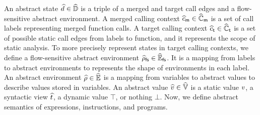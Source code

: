 An abstract state $\widehat{d} \in \widehat{\mathbb{D}}$ is a triple of a merged and target call
edges and a flow-sensitive abstract environment.  A merged calling context
$\widehat{c}_{\textsf{m}} \in \widehat{\mathbb{C}}_{\textsf{m}}$ is a set of call labels representing merged function
calls. A target calling context $\widehat{c}_{\textsf{t}} \in \widehat{\mathbb{C}}_{\textsf{t}}$ is a set of possible
static call edges from labels to function, and it represents the scope of static
analysis. To more precisely represent states in target calling contexts, we
define a flow-sensitive abstract environment $\widehat{\rho}_{\textsf{fs}} \in \widehat{\mathbb{E}}_{\textsf{fs}}$. It is
a mapping from labels to abstract environments to represents the shape of
environments in each label. An abstract environment $\widehat{\rho} \in \widehat{\mathbb{E}}$ is a
mapping from variables to abstract values to describe values stored in
variables. An abstract value $\widehat{v} \in \widehat{\mathbb{V}}$ is a static value $v$, a
syntactic view $\widehat{t}$, a dynamic value $\top$, or nothing $\bot$.  Now, we
define abstract semantics of expressions, instructions, and programs.

